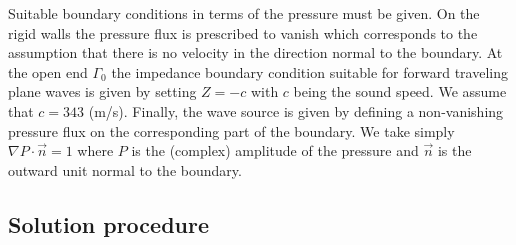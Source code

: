 Suitable boundary conditions in terms of the pressure must be given. 
On the rigid walls the pressure flux is prescribed to vanish which 
corresponds to the assumption that there is no velocity in the direction 
normal to the boundary. At the open end $\Gamma_0$ the impedance boundary 
condition suitable for forward traveling plane waves is given by setting 
$Z=-c$ with $c$ being the sound speed. We assume that $c=343$ (m/s). 
Finally, the wave source is given by defining a non-vanishing pressure
flux on the corresponding part of the boundary. We take simply 
$\nabla P \cdot \vec n = 1$ where $P$ is the (complex)
amplitude of the pressure and $\vec n$ is the outward unit normal to the
boundary. 


\subsection*{Solution procedure}

